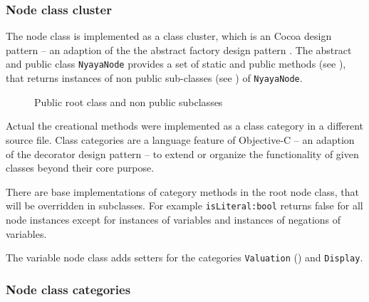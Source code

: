 \subsubsection{Node class cluster}

The node class is implemented as a class cluster, 
which is an Cocoa design pattern \cite[p.282ff]{Buck:2009:CDP:1803585}
– an adaption of the the abstract factory design pattern \cite[p.87ff]{GAMMAETAL}.
The abstract and public class \verb+NyayaNode+ 
provides a set of static and public methods (see ),
that returns instances of non public sub-classes (see )
of \verb+NyayaNode+.

\begin{figure}[htbp]
\begin{center}
\caption{Public root class and non public subclasses}
\label{fig:NyayaNodeCluster}
\end{center}
\end{figure}

Actual the creational methods were implemented as a class category in a different source file. 
Class categories are a language feature of Objective-C \cite[p.225ff]{Kochan:2009:PO:1538451}
– an adaption of the decorator design pattern \cite[p.175ff]{GAMMAETAL} – 
to extend or organize the functionality of given classes beyond their core purpose. 

There are base implementations of category methods in the root node class,
that will be overridden in subclasses.
For example \verb+isLiteral:bool+ returns false for all node instances
except for instances of variables
and instances of negations of variables.

The variable node class adds setters for the categories \verb+Valuation+  ()
and \verb+Display+.

\subsubsection{Node class categories}


